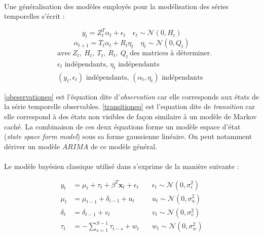 \documentclass{article}
\theoremstyle{definition}
\theoremstyle{remark}
\begin{document}
\paragraph{}
Une généralisation des modèles employés pour la modélisation des séries temporelles s'écrit :

\begin{equation}
	\label{obeservationeq}
	y_{t}=Z_{t}^{T} \alpha_{t}+\epsilon_{t} \quad \epsilon_{t} \sim \mathcal{N}\left(0, H_{t}\right)
\end{equation}
\begin{equation}
	\label{transitioneq}
	\alpha_{t+1}=T_{t} \alpha_{t}+R_{t} \eta_{t} \quad \eta_{t} \sim \mathcal{N}\left(0, Q_{t}\right)
\end{equation}
\vspace{0.1cm}
\[
	\begin{aligned}
		& \text{avec} \ Z_t, \ H_t , \ T_t, \ R_t, \ Q_t \ \text{des matrices à déterminer}. \\
		& \epsilon_t\text{ indépendants, }\eta_t\text{ indépendants} \\
		& (y_t,\epsilon_t)\text{ indépendants,  }(\alpha_t,\eta_t)\text{ indépendants}
	\end{aligned}
\]
	
\ref{obeservationeq} est l'équation dite d'\textit{observation} car elle corresponds aux états de la série temporelle observables. 
\ref{transitioneq} est l'equation dite de \textit{transition} car elle correspond à des états non visibles de façon similaire à un modèle de Markov caché. 
La combinaison de ces deux équations forme un modèle espace d'état (\textit{state space form model}) sous sa forme gaussienne linéaire. On peut notamment dériver un modèle $ARIMA$ de ce modèle général.

\paragraph{}

Le modèle bayésien classique utilisé dans \cite{pedictbayesian} s'exprime de la manière suivante :

\begin{equation}
	\label{modelebayes}
	\begin{aligned} 
		y_{t} &=\mu_{t}+\tau_{t}+\beta^{T} \mathbf{x}_{t}+\epsilon_{t} \quad & \epsilon_{t} 
		\sim \mathcal{N}(0, \sigma_{\epsilon}^2) \\ 
		\mu_{t} &=\mu_{t-1}+\delta_{t-1}+u_{t} \quad & u_{t} \sim \mathcal{N}(0, \sigma_{u}^2) \\
		\delta_{t} &=\delta_{t-1}+v_{t} \quad & v_{t} \sim \mathcal{N}(0, \sigma_{v}^2) \\
		\tau_{t} &=-\sum_{s=1}^{S-1} \tau_{t-s}+w_{t} \quad & w_{t} \sim \mathcal{N}(0, \sigma_{w}^2)
	\end{aligned}
\end{equation}
\end{document}
